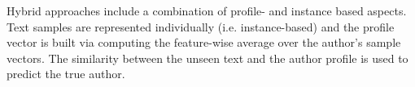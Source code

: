 Hybrid approaches include a combination of profile- and instance based aspects.
Text samples are represented individually (i.e. instance-based) and 
the profile vector is built via computing the feature-wise average over the author's sample vectors.
The similarity between the unseen text and the author profile is used to predict the true author.